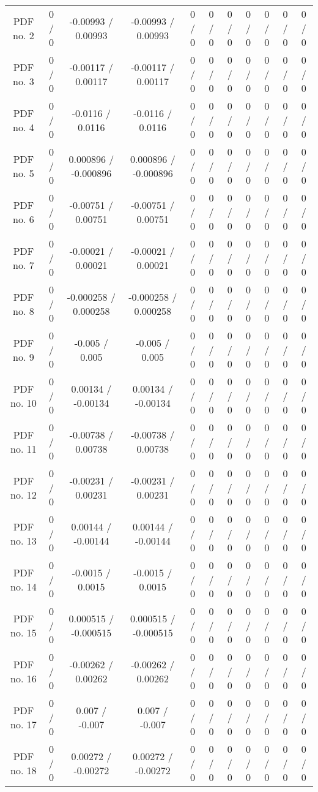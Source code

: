 {\begin{landscape}
\begin{longtable}{@{\extracolsep{\fill}}| *{11}{c|}}
  PDF no. 2 & 0 / 0 & -0.00993 / 0.00993 & -0.00993 / 0.00993 & 0 / 0 & 0 / 0 & 0 / 0 & 0 / 0 & 0 / 0 & 0 / 0 & 0 / 0 \\ 
  PDF no. 3 & 0 / 0 & -0.00117 / 0.00117 & -0.00117 / 0.00117 & 0 / 0 & 0 / 0 & 0 / 0 & 0 / 0 & 0 / 0 & 0 / 0 & 0 / 0 \\ 
  PDF no. 4 & 0 / 0 & -0.0116 / 0.0116 & -0.0116 / 0.0116 & 0 / 0 & 0 / 0 & 0 / 0 & 0 / 0 & 0 / 0 & 0 / 0 & 0 / 0 \\ 
  PDF no. 5 & 0 / 0 & 0.000896 / -0.000896 & 0.000896 / -0.000896 & 0 / 0 & 0 / 0 & 0 / 0 & 0 / 0 & 0 / 0 & 0 / 0 & 0 / 0 \\ 
  PDF no. 6 & 0 / 0 & -0.00751 / 0.00751 & -0.00751 / 0.00751 & 0 / 0 & 0 / 0 & 0 / 0 & 0 / 0 & 0 / 0 & 0 / 0 & 0 / 0 \\ 
  PDF no. 7 & 0 / 0 & -0.00021 / 0.00021 & -0.00021 / 0.00021 & 0 / 0 & 0 / 0 & 0 / 0 & 0 / 0 & 0 / 0 & 0 / 0 & 0 / 0 \\ 
  PDF no. 8 & 0 / 0 & -0.000258 / 0.000258 & -0.000258 / 0.000258 & 0 / 0 & 0 / 0 & 0 / 0 & 0 / 0 & 0 / 0 & 0 / 0 & 0 / 0 \\ 
  PDF no. 9 & 0 / 0 & -0.005 / 0.005 & -0.005 / 0.005 & 0 / 0 & 0 / 0 & 0 / 0 & 0 / 0 & 0 / 0 & 0 / 0 & 0 / 0 \\ 
  PDF no. 10 & 0 / 0 & 0.00134 / -0.00134 & 0.00134 / -0.00134 & 0 / 0 & 0 / 0 & 0 / 0 & 0 / 0 & 0 / 0 & 0 / 0 & 0 / 0 \\ 
  PDF no. 11 & 0 / 0 & -0.00738 / 0.00738 & -0.00738 / 0.00738 & 0 / 0 & 0 / 0 & 0 / 0 & 0 / 0 & 0 / 0 & 0 / 0 & 0 / 0 \\ 
  PDF no. 12 & 0 / 0 & -0.00231 / 0.00231 & -0.00231 / 0.00231 & 0 / 0 & 0 / 0 & 0 / 0 & 0 / 0 & 0 / 0 & 0 / 0 & 0 / 0 \\ 
  PDF no. 13 & 0 / 0 & 0.00144 / -0.00144 & 0.00144 / -0.00144 & 0 / 0 & 0 / 0 & 0 / 0 & 0 / 0 & 0 / 0 & 0 / 0 & 0 / 0 \\ 
  PDF no. 14 & 0 / 0 & -0.0015 / 0.0015 & -0.0015 / 0.0015 & 0 / 0 & 0 / 0 & 0 / 0 & 0 / 0 & 0 / 0 & 0 / 0 & 0 / 0 \\ 
  PDF no. 15 & 0 / 0 & 0.000515 / -0.000515 & 0.000515 / -0.000515 & 0 / 0 & 0 / 0 & 0 / 0 & 0 / 0 & 0 / 0 & 0 / 0 & 0 / 0 \\ 
  PDF no. 16 & 0 / 0 & -0.00262 / 0.00262 & -0.00262 / 0.00262 & 0 / 0 & 0 / 0 & 0 / 0 & 0 / 0 & 0 / 0 & 0 / 0 & 0 / 0 \\ 
  PDF no. 17 & 0 / 0 & 0.007 / -0.007 & 0.007 / -0.007 & 0 / 0 & 0 / 0 & 0 / 0 & 0 / 0 & 0 / 0 & 0 / 0 & 0 / 0 \\ 
  PDF no. 18 & 0 / 0 & 0.00272 / -0.00272 & 0.00272 / -0.00272 & 0 / 0 & 0 / 0 & 0 / 0 & 0 / 0 & 0 / 0 & 0 / 0 & 0 / 0 \\ 

\end{longtable}
\end{landscape}}
